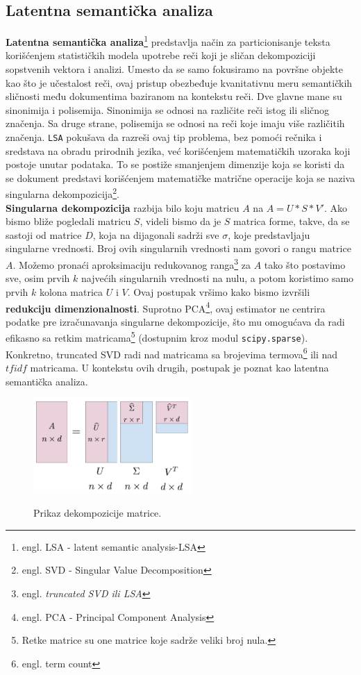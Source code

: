 \documentclass[a4paper]{article}
\begin{document}
\subsection{Latentna semantička analiza}
\textbf{Latentna semantička analiza}\footnote{engl. LSA - latent semantic analysis-LSA} predstavlja način za particionisanje teksta korišćenjem statističkih modela upotrebe reči koji je sličan dekompoziciji sopstvenih vektora i analizi. Umesto da se samo fokusiramo na površne objekte kao što je učestalost reči, ovaj pristup obezbeđuje kvanitativnu meru semantičkih sličnosti među dokumentima baziranom na kontekstu reči. Dve glavne mane su sinonimija i polisemija. Sinonimija se odnosi na različite reči istog ili sličnog značenja. Sa druge strane, polisemija se odnosi na reči koje imaju više različitih značenja. \texttt{LSA} pokušava da razreši ovaj tip problema, bez pomoći rečnika i sredstava na obradu prirodnih jezika, već korišćenjem matematičkih uzoraka koji postoje unutar podataka. To se postiže smanjenjem dimenzije koja se koristi da se dokument predstavi korišćenjem matematičke matrične operacije koja se naziva singularna dekompozicija\footnote{engl. SVD - Singular Value Decomposition}.\\

\textbf{Singularna dekompozicija} razbija bilo koju matricu $A$ na $A=U*S*V'$. Ako bismo bliže pogledali matricu $S$, videli bismo da je $S$ matrica forme, takve, da se sastoji od matrice $D$, koja na dijagonali sadrži sve $\sigma$, koje predstavljaju singularne vrednosti. Broj ovih singularnih vrednosti nam govori o rangu matrice $A$. Možemo pronaći aproksimaciju redukovanog ranga\footnote{engl. \em{truncated SVD} ili \em{LSA}} za $A$ tako što postavimo sve, osim prvih $k$ najvećih singularnih vrednosti na nulu, a potom koristimo samo prvih $k$ kolona matrica $U$ i $V$. Ovaj postupak vršimo kako bismo izvršili \textbf{redukciju dimenzionalnosti}. Suprotno PCA\footnote{engl. PCA - Principal Component Analysis}, ovaj estimator ne centrira podatke pre izračunavanja singularne dekompozicije, što mu omogućava da radi efikasno sa retkim matricama\footnote{Retke matrice su one matrice koje sadrže veliki broj nula.} (dostupnim kroz modul \texttt{scipy.sparse}). Konkretno, truncated SVD radi nad matricama sa brojevima termova\footnote{engl. term count} ili nad $tfidf$ matricama. U kontekstu ovih drugih, postupak je poznat kao latentna semantička analiza.\\

\begin{figure}[t]
\includegraphics[width=6cm]{Pictures/svd-matrices.png}
\centering
\label{fig:svd}
\caption{Prikaz dekompozicije matrice.}
\end{figure}
\end{document}
